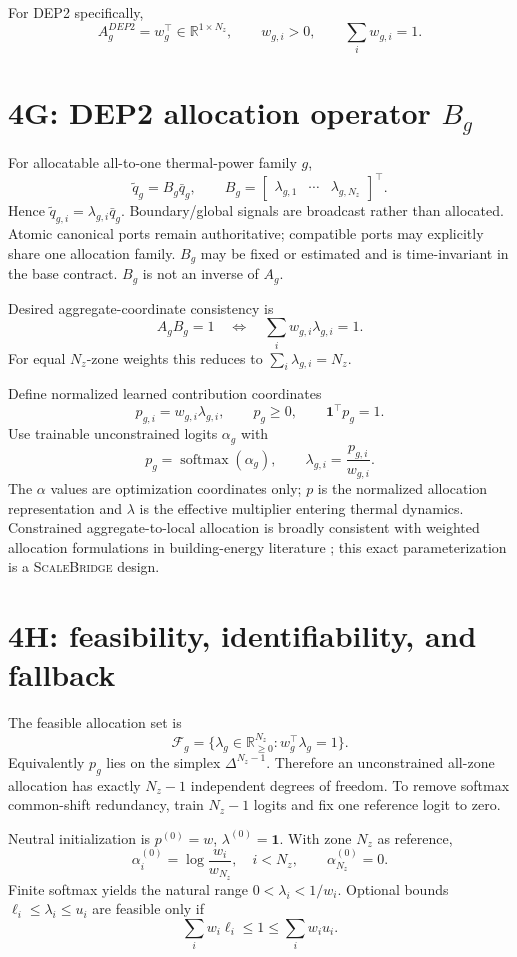 \documentclass[11pt]{article}
\newcommand{\R}{\mathbb{R}}
\newcommand{\ones}{\mathbf{1}}
\newcommand{\ScaleBridge}{\textsc{ScaleBridge}}
\begin{document}
For DEP2 specifically,
\[
A_g^{DEP2}=w_g^\top\in\R^{1\times N_z},\qquad w_{g,i}>0,\qquad \sum_iw_{g,i}=1.
\]

\section{4G: DEP2 allocation operator $B_g$}
For allocatable all-to-one thermal-power family $g$,
\[
\tilde q_g=B_g\bar q_g,
\qquad
B_g=\begin{bmatrix}\lambda_{g,1}&\cdots&\lambda_{g,N_z}\end{bmatrix}^\top.
\]
Hence $\tilde q_{g,i}=\lambda_{g,i}\bar q_g$.  Boundary/global signals are broadcast rather than allocated. Atomic canonical ports remain authoritative; compatible ports may explicitly share one allocation family.  $B_g$ may be fixed or estimated and is time-invariant in the base contract. $B_g$ is not an inverse of $A_g$.

Desired aggregate-coordinate consistency is
\[
A_gB_g=1
\quad\Longleftrightarrow\quad
\sum_i w_{g,i}\lambda_{g,i}=1.
\]
For equal $N_z$-zone weights this reduces to $\sum_i\lambda_{g,i}=N_z$.

Define normalized learned contribution coordinates
\[
p_{g,i}=w_{g,i}\lambda_{g,i},\qquad p_g\ge0,\qquad \ones^\top p_g=1.
\]
Use trainable unconstrained logits $\alpha_g$ with
\[
p_g=\operatorname{softmax}(\alpha_g),\qquad
\lambda_{g,i}=\frac{p_{g,i}}{w_{g,i}}.
\]
The $\alpha$ values are optimization coordinates only; $p$ is the normalized allocation representation and $\lambda$ is the effective multiplier entering thermal dynamics.  Constrained aggregate-to-local allocation is broadly consistent with weighted allocation formulations in building-energy literature \citep{TelsangEtAl2021WeightedAllocation}; this exact parameterization is a \ScaleBridge{} design.

\section{4H: feasibility, identifiability, and fallback}
The feasible allocation set is
\[
\mathcal F_g=\{\lambda_g\in\R_{\ge0}^{N_z}:w_g^\top\lambda_g=1\}.
\]
Equivalently $p_g$ lies on the simplex $\Delta^{N_z-1}$. Therefore an unconstrained all-zone allocation has exactly $N_z-1$ independent degrees of freedom. To remove softmax common-shift redundancy, train $N_z-1$ logits and fix one reference logit to zero.

Neutral initialization is $p^{(0)}=w$, $\lambda^{(0)}=\ones$. With zone $N_z$ as reference,
\[
\alpha_i^{(0)}=\log\frac{w_i}{w_{N_z}},\quad i<N_z,
\qquad \alpha_{N_z}^{(0)}=0.
\]
Finite softmax yields the natural range $0<\lambda_i<1/w_i$. Optional bounds $\ell_i\le\lambda_i\le u_i$ are feasible only if
\[
\sum_iw_i\ell_i\le1\le\sum_iw_iu_i.
\]
\end{document}
